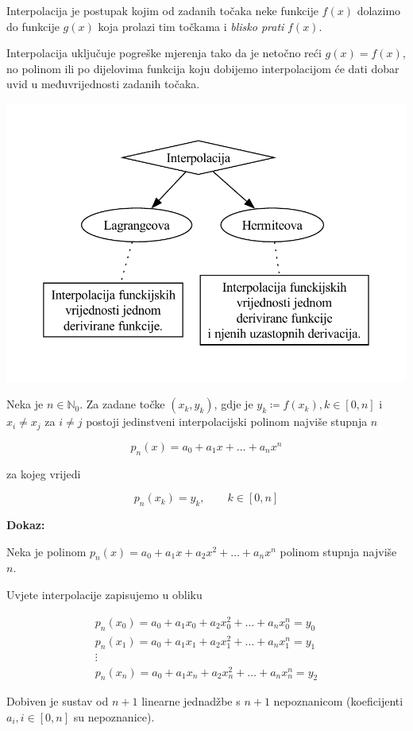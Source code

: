 Interpolacija je postupak kojim od zadanih točaka neke funkcije $f(x)$ dolazimo
do funkcije $g(x)$ koja prolazi tim točkama i \textit{blisko prati} $f(x)$.

Interpolacija uključuje pogreške mjerenja tako da je netočno reći $g(x) = f(x)$,
no polinom ili po dijelovima funkcija koju dobijemo interpolacijom će dati
dobar uvid u međuvrijednosti zadanih točaka.

\begin{center}
    \includegraphics[width=0.5\linewidth]{interpolation.pdf}
\end{center}

\begin{theorem}
    Neka je $n\in\mathbb{N}_0$. Za zadane točke $(x_k,y_k)$, gdje je $y_k\coloneq f(x_k), k\in[0,n]$ i $x_i\neq x_j$ za $i\neq j$ postoji jedinstveni interpolacijski polinom najviše stupnja $n$

    $$
        p_n(x)=a_0+a_1x+\dots+a_nx^n
    $$

    za kojeg vrijedi

    $$
        p_n(x_k) = y_k,\qquad k\in[0,n]
    $$
\end{theorem}

\textbf{Dokaz:}

\bigskip

Neka je polinom $p_n(x)=a_0+a_1x+a_2x^2+\dots+a_nx^n$ polinom stupnja najviše $n$.

Uvjete interpolacije zapisujemo u obliku

\begin{gather*}
    p_n(x_0)=a_0+a_1x_0+a_2x_0^2+\dots+a_nx_0^n=y_0\\
    p_n(x_1)=a_0+a_1x_1+a_2x_1^2+\dots+a_nx_1^n=y_1\\
    \vdots\\
    p_n(x_n)=a_0+a_1x_n+a_2x_n^2+\dots+a_nx_n^n=y_2
\end{gather*}

Dobiven je sustav od $n+1$ linearne jednadžbe s $n+1$ nepoznanicom (koeficijenti $a_i, i\in[0,n]$ su nepoznanice).

